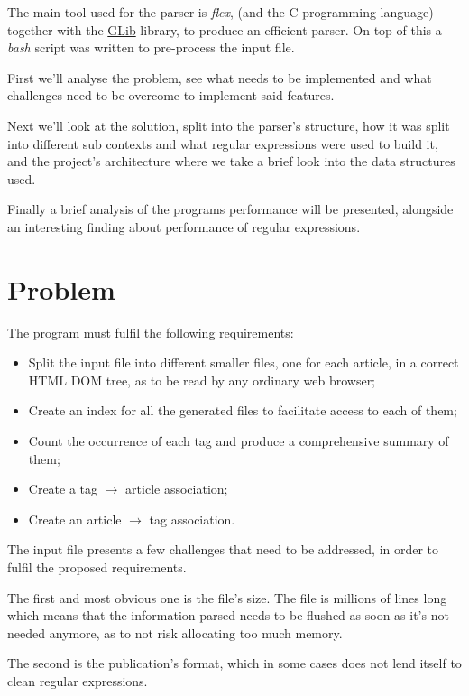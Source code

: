 \documentclass[a4paper]{report}
\begin{document}
The main tool used for the parser is \textit{flex}, (and the C programming
language) together with the \href{https://developer.gnome.org/}{GLib} library,
to produce an efficient parser. On top of this a \textit{bash} script was
written to pre-process the input file.

First we'll analyse the problem, see what needs to be implemented and what
challenges need to be overcome to implement said features.

Next we'll look at the solution, split into the parser's structure, how it was
split into different sub contexts and what regular expressions were used to
build it, and the project's architecture where we take a brief look into the
data structures used.

Finally a brief analysis of the programs performance will be presented,
alongside an interesting finding about performance of regular expressions.

\chapter{Problem}

The program must fulfil the following requirements:
\begin{itemize}
    \item Split the input file into different smaller files, one for each
        article, in a correct HTML DOM tree, as to be read by any ordinary web
        browser;
    \item Create an index for all the generated files to facilitate access to
        each of them;
    \item Count the occurrence of each tag and produce a comprehensive summary
        of them;
    \item Create a tag $\to$ article association;
    \item Create an article $\to$ tag association.
\end{itemize}

The input file presents a few challenges that need to be addressed, in order to
fulfil the proposed requirements.

The first and most obvious one is the file's size. The file is millions of lines long
which means that the information parsed needs to be flushed as soon as it's not
needed anymore, as to not risk allocating too much memory.

The second is the publication's format, which in some cases does not lend
itself to clean regular expressions.
\end{document}
